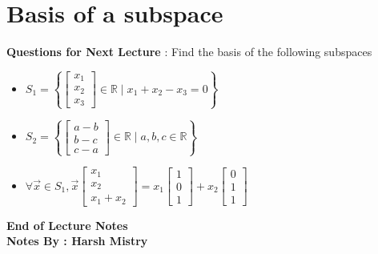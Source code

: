 \documentclass{article}
\begin{document}
\section{Basis of a subspace}
\textbf{Questions for Next Lecture} : Find the basis of the following subspaces 
\begin{itemize}
\item \( S_1 = \left\{ \begin{bmatrix} x_1 \\ x_2 \\ x_3 \end{bmatrix} \in \mathbb{R} \mid x_1 + x_2 - x_3 = 0 \right\} \)
\item \( S_2 = \left\{ \begin{bmatrix} a - b \\ b - c \\ c - a \end{bmatrix} \in \mathbb{R} \mid a , b , c \in \mathbb{R}  \right\} \)
\item \( \forall \vec{x} \in S_1 , \vec{x} \begin{bmatrix} x_1 \\ x_2 \\ x_1 + x_2 \end{bmatrix} = x_1 \begin{bmatrix} 1 \\ 0 \\ 1 \end{bmatrix} + x_2 \begin{bmatrix} 0 \\ 1 \\ 1 \end{bmatrix} \)
\end{itemize}



\begin{center}
\textbf{End of Lecture Notes} \\
\textbf{Notes By : Harsh Mistry}
\end{center}
\end{document}
